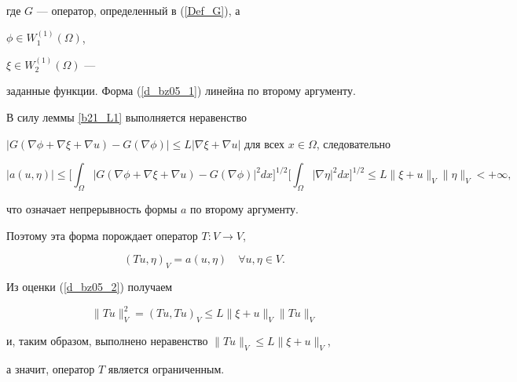 где $G$ --- оператор, определенный в (\ref{Def_G}), а


$\phi \in {W}^{(1)}_{1} (\Omega)$,


$\xi \in {W}^{(1)}_{2} (\Omega)$ ---


заданные функции. Форма (\ref {d_bz05_1}) линейна по второму аргументу.


В силу леммы \ref{b21_L1} выполняется неравенство


$|G(\nabla \phi + \nabla \xi+ \nabla u) -G(\nabla \phi)|\leq L 


|\nabla \xi+\nabla u|$ для всех $x \in \Omega $, следовательно


\begin{equation}


|a(u, \eta)|\leq


\bigg[\int_{\Omega}


|G(\nabla \phi + \nabla \xi + \nabla u) -G(\nabla \phi)|^2 dx\bigg]^{1/2}


\bigg[\int_{\Omega }|\nabla \eta|^2 dx \bigg]^{1/2}\leq


L \|\xi + u \|_V \|\eta \|_V < +\infty,


\label{d_bz05_2}


\end{equation}


что означает непрерывность формы $a$ по второму аргументу.


Поэтому эта форма порождает оператор $T : V \rightarrow V$,


\begin{equation}\label{Def_T}


(Tu, \eta)_V = a(u, \eta) \quad \forall u, \eta \in V.


\end{equation}





Из оценки (\ref{d_bz05_2}) получаем


$$


\|Tu \|_V^2 = (Tu, Tu)_V \leq L \|\xi + u \|_V \|Tu \|_V


$$


и, таким образом, выполнено неравенство $\|Tu \|_V \leq L \|\xi + u


\|_V$,


а значит, оператор $T$ является ограниченным.





